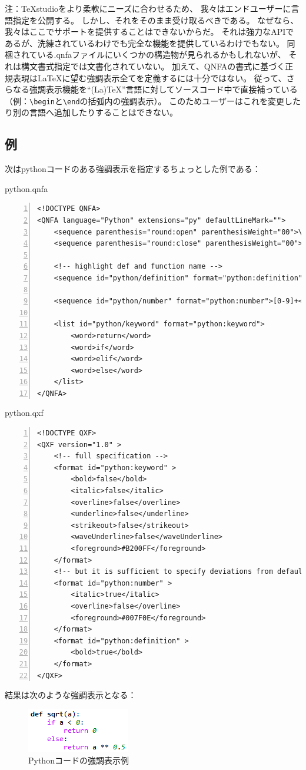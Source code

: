 注：TeXstudioをより柔軟にニーズに合わせるため、
我々はエンドユーザーに言語指定を公開する。
しかし、それをそのまま受け取るべきである。
なぜなら、我々はここでサポートを提供することはできないからだ。
それは強力なAPIであるが、洗練されているわけでも完全な機能を提供しているわけでもない。
同梱されている.qnfaファイルにいくつかの構造物が見られるかもしれないが、
それは構文書式指定では文書化されていない。
加えて、QNFAの書式に基づく正規表現はLaTeXに望む強調表示全てを定義するには十分ではない。
従って、さらなる強調表示機能を``(La)TeX''言語に対してソースコード中で直接補っている
（例：\verb+\begin+と\verb+\end+の括弧内の強調表示）。
このためユーザーはこれを変更したり別の言語へ追加したりすることはできない。

\subsection{例}

次はpythonコードのある強調表示を指定するちょっとした例である：

python.qnfa

\begin{lstlisting}[frame=single,breaklines=true,numbers=left]
<!DOCTYPE QNFA>
<QNFA language="Python" extensions="py" defaultLineMark="">
    <sequence parenthesis="round:open" parenthesisWeight="00">\(</sequence>
    <sequence parenthesis="round:close" parenthesisWeight="00">\)</sequence>

    <!-- highlight def and function name -->
    <sequence id="python/definition" format="python:definition">def$s?$w*</sequence>

    <sequence id="python/number" format="python:number">[0-9]+</sequence>

    <list id="python/keyword" format="python:keyword">
        <word>return</word>
        <word>if</word>
        <word>elif</word>
        <word>else</word>
    </list>
</QNFA>
\end{lstlisting}

python.qxf

\begin{lstlisting}[frame=single,breaklines=true,numbers=left]
<!DOCTYPE QXF>
<QXF version="1.0" >
    <!-- full specification -->
    <format id="python:keyword" >
        <bold>false</bold>
        <italic>false</italic>
        <overline>false</overline>
        <underline>false</underline>
        <strikeout>false</strikeout>
        <waveUnderline>false</waveUnderline>
        <foreground>#B200FF</foreground>
    </format>
    <!-- but it is sufficient to specify deviations from default -->
    <format id="python:number" >
        <italic>true</italic>
        <overline>false</overline>
        <foreground>#007F0E</foreground>
    </format>
    <format id="python:definition" >
        <bold>true</bold>
    </format>
</QXF>
\end{lstlisting}

結果は次のような強調表示となる：

\begin{figure}[H]
  \centering
  \includegraphics{format_example.png}
  \caption{Pythonコードの強調表示例}
\end{figure}
